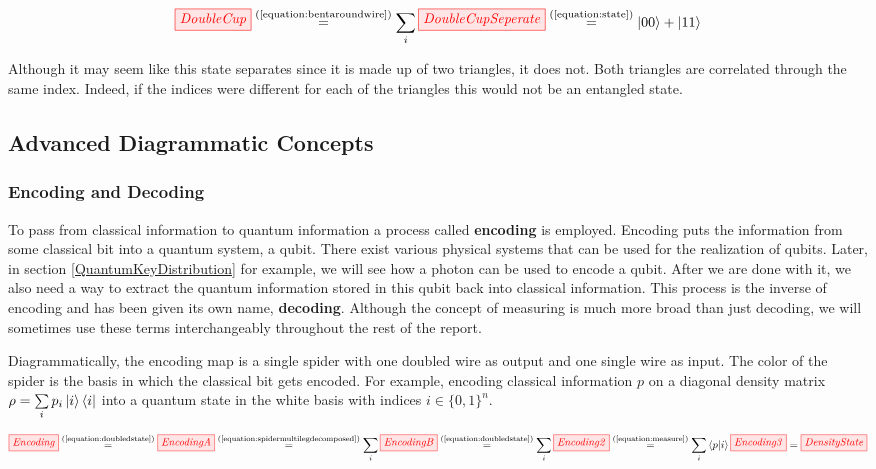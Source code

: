 \documentclass[]{article}
\newcommand{\equaltext}[1]{\ensuremath{\stackrel{\text{#1}}{=}}}
\begin{document}
\begin{equation}
\label{equation:doublecup}
\tikzfig{DoubleCup} \equaltext{(\ref{equation:bentaroundwire})} \sum\limits_{i} \tikzfig{DoubleCupSeperate} \equaltext{(\ref{equation:state})} \ket{00} + \ket{11}
\end{equation}

Although it may seem like this state separates since it is made up of two triangles, it does not. Both triangles are correlated through the same index. Indeed, if the indices were different for each of the triangles this would not be an entangled state.

\subsection{Advanced Diagrammatic Concepts}

\subsubsection{Encoding and Decoding}
\label{encodingdecoding}

To pass from classical information to quantum information a process called \textbf{encoding} is employed. Encoding puts the information from some classical bit into a quantum system, a qubit. There exist various physical systems that can be used for the realization of qubits. Later, in section \ref{QuantumKeyDistribution} for example, we will see how a photon can be used to encode a qubit. After we are done with it, we also need a way to extract the quantum information stored in this qubit back into classical information. This process is the inverse of encoding and has been given its own name, \textbf{decoding}. Although the concept of measuring is much more broad than just decoding, we will sometimes use these terms interchangeably throughout the rest of the report.

Diagrammatically, the encoding map is a single spider with one doubled wire as output and one single wire as input. The color of the spider is the basis in which the classical bit gets encoded. For example, encoding classical information $p$ on a diagonal density matrix $\rho = \sum\limits_i p_i \ket{i}\bra{i}$ into a quantum state in the white basis with indices $i \in \{0,1\}^n$.

\begin{equation}
	\label{equation:Encoding}
	\tikzfig{Encoding} \equaltext{(\ref{equation:doubledstate})} \tikzfig{EncodingA} \equaltext{(\ref{equation:spidermultilegdecomposed})}
	\sum\limits_{i} \tikzfig{EncodingB} \equaltext{(\ref{equation:doubledstate})} \sum\limits_{i} \tikzfig{Encoding2} \equaltext{(\ref{equation:measure})} \sum\limits_{i} \bra{p}\ket{i} \tikzfig{Encoding3} = \tikzfig{DensityState}
\end{equation}
\end{document}
